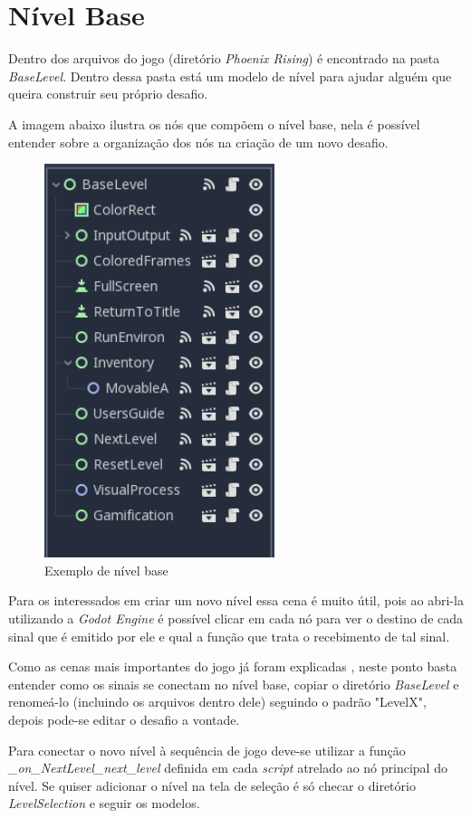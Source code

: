 \section{Nível Base}

Dentro dos arquivos do jogo (diretório \textit{Phoenix Rising}) é encontrado na
pasta \textit{BaseLevel}. Dentro dessa pasta está um modelo de nível para ajudar 
alguém que queira construir seu próprio desafio.

A imagem abaixo ilustra os nós que compõem o nível base, nela é 
possível entender sobre a organização dos nós na criação de um novo desafio. 

\begin{figure}[H]
    \includegraphics[width=0.6\textwidth]{../figuras/exemplo_base_level.png}
    \caption{Exemplo de nível base}
\end{figure}

Para os interessados em criar um novo nível essa cena é muito útil, pois ao 
abri-la utilizando a \textit{Godot Engine} é possível clicar em cada nó para ver
o destino de cada sinal que é emitido por ele e qual a função que trata o 
recebimento de tal sinal.

Como as cenas mais importantes do jogo já foram explicadas , neste ponto basta
entender como os sinais se conectam no nível base, copiar o diretório
\textit{BaseLevel} e renomeá-lo (incluindo os arquivos dentro dele)
seguindo o padrão "LevelX", depois pode-se editar o desafio a vontade.

Para conectar o novo nível à sequência de jogo deve-se utilizar a função
\textit{\_on\_NextLevel\_next\_level} definida em cada \textit{script}
atrelado ao nó principal do nível. Se quiser adicionar o nível na tela de 
seleção é só checar o diretório \textit{LevelSelection} e seguir os modelos.